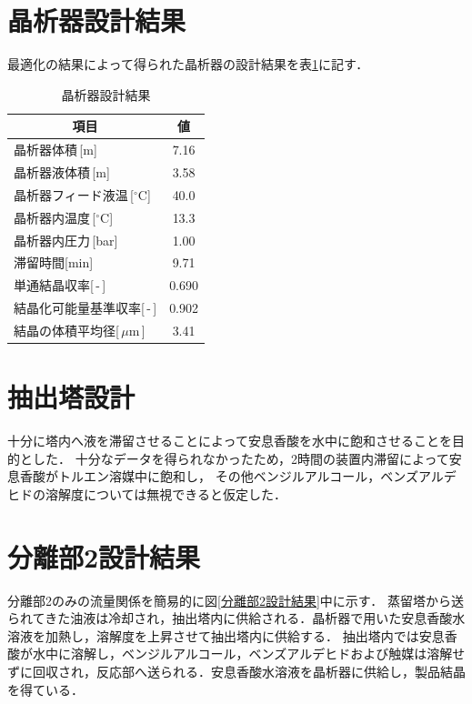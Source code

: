 \documentclass[a4j]{jsreport}
\begin{document}
\section{晶析器設計結果}
最適化の結果によって得られた晶析器の設計結果を表\ref{晶析器設計結果}に記す．
\begin{table}[htbp]
    \caption{晶析器設計結果}
    \label{晶析器設計結果}
    \begin{center}
        \begin{tabular}{lc}\hline
            \multicolumn{1}{c}{項目}       &  値    \\   \hline
            晶析器体積\,[m]                 &7.16    \\
            晶析器液体積\,[m]                &3.58    \\
            晶析器フィード液温\,[$^\circ$C]   &40.0    \\
            晶析器内温度\,[$^\circ$C]         &13.3   \\
            晶析器内圧力\,[bar]               &1.00    \\
            滞留時間[min]                    &9.71    \\
            単通結晶収率[\,-\,]               &0.690   \\
            結晶化可能量基準収率[\,-\,]        &0.902    \\
            結晶の体積平均径[\,$\mu$m\,]      &3.41     \\ \hline
        \end{tabular}
    \end{center}
\end{table}

\section{抽出塔設計}
十分に塔内へ液を滞留させることによって安息香酸を水中に飽和させることを目的とした．
十分なデータを得られなかったため，2時間の装置内滞留によって安息香酸がトルエン溶媒中に飽和し，
その他ベンジルアルコール，ベンズアルデヒドの溶解度については無視できると仮定した．

\section{分離部2設計結果}
分離部2のみの流量関係を簡易的に図\ref{分離部2設計結果}中に示す．
蒸留塔から送られてきた油液は冷却され，抽出塔内に供給される．晶析器で用いた安息香酸水溶液を加熱し，溶解度を上昇させて抽出塔内に供給する．
抽出塔内では安息香酸が水中に溶解し，ベンジルアルコール，ベンズアルデヒドおよび触媒は溶解せずに回収され，反応部へ送られる．安息香酸水溶液を晶析器に供給し，製品結晶を得ている．
\end{document}
